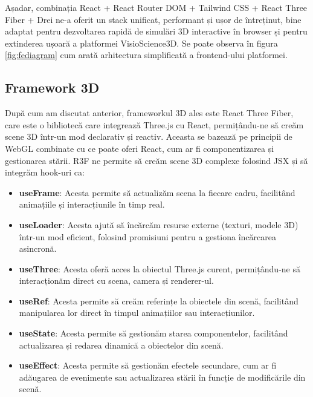 Așadar, combinația React + React Router DOM + Tailwind CSS + React Three Fiber + Drei ne-a oferit un
stack unificat, performant și ușor de întreținut, bine adaptat
pentru dezvoltarea rapidă de simulări 3D interactive în browser și pentru extinderea ușoară a
platformei VisioScience3D. Se poate observa în figura \ref{fig:fediagram} cum arată
arhitectura simplificată a frontend-ului platformei.


\subsection{Framework 3D}

După cum am discutat anterior, frameworkul 3D ales este React Three Fiber, care
este o bibliotecă care integrează Three.js cu React, permițându-ne să creăm scene 3D
într-un mod declarativ și reactiv. Aceasta se bazează pe principii de WebGL combinate
cu ce poate oferi React, cum ar fi componentizarea și gestionarea stării. R3F ne permite să
creăm scene 3D complexe folosind JSX și să integrăm hook-uri ca:

\begin{itemize}
\item
  \textbf{useFrame}:
    Acesta permite să actualizăm scena la fiecare cadru, facilitând animațiile și interacțiunile
    în timp real.
\item
  \textbf{useLoader}:
    Acesta ajută să încărcăm resurse externe (texturi, modele 3D) într-un mod eficient,
    folosind promisiuni pentru a gestiona încărcarea asincronă.
\item
  \textbf{useThree}:
    Acesta oferă acces la obiectul Three.js curent, permițându-ne să interacționăm direct
    cu scena, camera și renderer-ul.
\item
  \textbf{useRef}:
    Acesta permite să creăm referințe la obiectele din scenă, facilitând manipularea lor
    direct în timpul animațiilor sau interacțiunilor.
\item
  \textbf{useState}:
    Acesta permite să gestionăm starea componentelor, facilitând actualizarea și redarea
    dinamică a obiectelor din scenă.
\item
  \textbf{useEffect}:
    Acesta permite să gestionăm efectele secundare, cum ar fi adăugarea de evenimente sau
    actualizarea stării în funcție de modificările din scenă.
\end{itemize}

